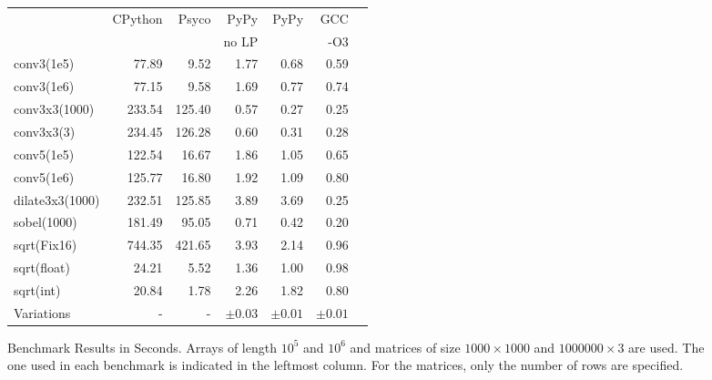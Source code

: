\documentclass[preprint]{sigplanconf}
\begin{document}
\begin{figure}
\begin{center}
{\smaller
\begin{tabular}{|l|r|r|r|r|r|r|}
\hline
 & CPython & Psyco & PyPy  & PyPy & GCC \\
 &         &       & no LP &      & -O3 \\
\hline
conv3(1e5) & 77.89 & 9.52 & 1.77  & 0.68 &  0.59 \\
\hline
conv3(1e6) & 77.15 & 9.58 & 1.69  & 0.77 &  0.74 \\
\hline
conv3x3(1000) & 233.54 & 125.40 & 0.57 & 0.27 & 0.25 \\
\hline
conv3x3(3) & 234.45 & 126.28 & 0.60 & 0.31 & 0.28 \\
\hline
conv5(1e5) & 122.54 & 16.67 & 1.86  & 1.05 &  0.65\\
\hline
conv5(1e6) & 125.77 & 16.80 & 1.92 & 1.09 &  0.80 \\
\hline
dilate3x3(1000) & 232.51 & 125.85 & 3.89 & 3.69 & 0.25 \\
\hline
sobel(1000) & 181.49 & 95.05 & 0.71 & 0.42 & 0.20 \\
\hline
sqrt(Fix16) & 744.35 & 421.65 & 3.93  & 2.14  & 0.96 \\
\hline
sqrt(float) & 24.21 & 5.52 & 1.36 & 1.00 & 0.98\\
\hline
sqrt(int) & 20.84 & 1.78 & 2.26 & 1.82  & 0.80 \\
\hline
\hline
Variations & - & - & $\pm 0.03$ & $\pm 0.01$ & $\pm 0.01$ \\
\hline
\end{tabular}
}
\end{center}
\label{fig:benchmarks}
\caption{Benchmark Results in Seconds. Arrays of length $10^5$ and
  $10^6$ and matrices of size $1000\times 1000$ and $1000000 \times
  3$ are used. The one used in each benchmark is indicated in
  the leftmost column. For the matrices, only the number of rows are
  specified.} 
\end{figure}
\end{document}
